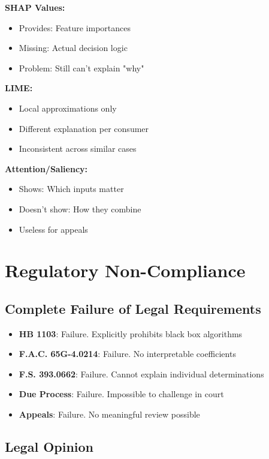 \textbf{SHAP Values:}
\begin{itemize}
    \item Provides: Feature importances
    \item Missing: Actual decision logic
    \item Problem: Still can't explain "why"
\end{itemize}

\textbf{LIME:}
\begin{itemize}
    \item Local approximations only
    \item Different explanation per consumer
    \item Inconsistent across similar cases
\end{itemize}

\textbf{Attention/Saliency:}
\begin{itemize}
    \item Shows: Which inputs matter
    \item Doesn't show: How they combine
    \item Useless for appeals
\end{itemize}

\section{Regulatory Non-Compliance}

\subsection{Complete Failure of Legal Requirements}

\begin{itemize}
    \item \textbf{HB 1103}: Failure.  Explicitly prohibits black box algorithms
    \item \textbf{F.A.C. 65G-4.0214}: Failure.  No interpretable coefficients
    \item \textbf{F.S. 393.0662}: Failure.  Cannot explain individual determinations
    \item \textbf{Due Process}: Failure.  Impossible to challenge in court
    \item \textbf{Appeals}: Failure.  No meaningful review possible
\end{itemize}

\subsection{Legal Opinion}

